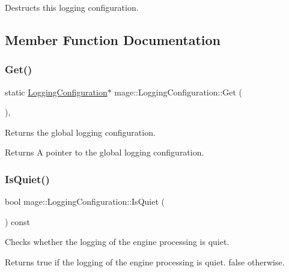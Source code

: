 Destructs this logging configuration. 

\subsection{Member Function Documentation}
\hypertarget{classmage_1_1_logging_configuration_a9a2b9343e49bd5befe10cf06225e5c83}{}\label{classmage_1_1_logging_configuration_a9a2b9343e49bd5befe10cf06225e5c83} 
\subsubsection{\texorpdfstring{Get()}{Get()}}
{\footnotesize\ttfamily static \hyperlink{classmage_1_1_logging_configuration}{Logging\+Configuration}$\ast$ mage\+::\+Logging\+Configuration\+::\+Get (\begin{DoxyParamCaption}{ }\end{DoxyParamCaption})\hspace{0.3cm}{\ttfamily [static]}, {\ttfamily [noexcept]}}

Returns the global logging configuration.

\begin{DoxyReturn}{Returns}
A pointer to the global logging configuration. 
\end{DoxyReturn}
\hypertarget{classmage_1_1_logging_configuration_a64f7a7b45bc0e896b9d493ddaf13ca82}{}\label{classmage_1_1_logging_configuration_a64f7a7b45bc0e896b9d493ddaf13ca82} 
\subsubsection{\texorpdfstring{Is\+Quiet()}{IsQuiet()}}
{\footnotesize\ttfamily bool mage\+::\+Logging\+Configuration\+::\+Is\+Quiet (\begin{DoxyParamCaption}{ }\end{DoxyParamCaption}) const\hspace{0.3cm}{\ttfamily [noexcept]}}

Checks whether the logging of the engine processing is quiet.

\begin{DoxyReturn}{Returns}
{\ttfamily true} if the logging of the engine processing is quiet. {\ttfamily false} otherwise. 
\end{DoxyReturn}
\hypertarget{classmage_1_1_logging_configuration_a4ad7dc55f8d105c1125adcea4796bb3b}{}\label{classmage_1_1_logging_configuration_a4ad7dc55f8d105c1125adcea4796bb3b} 
